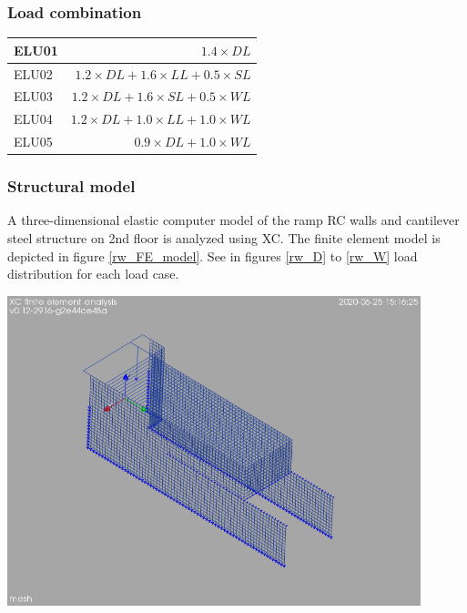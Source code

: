 \subsubsection{Load combination}
\begin{center}
  \begin{tabular}{|l|r|}
\hline
ELU01 & $1.4 \times DL$ \\
\hline
ELU02 & $ 1.2 \times DL +1.6 \times LL +0.5 \times SL $ \\
\hline
ELU03 & $ 1.2 \times DL +1.6 \times SL +0.5 \times WL $ \\
\hline
ELU04 & $ 1.2 \times DL +1.0 \times LL +1.0 \times WL $ \\
\hline
ELU05 & $ 0.9 \times DL +1.0 \times WL $ \\
\hline
\end{tabular}
\end{center}

\subsubsection{Structural model}
A three-dimensional elastic computer model of the ramp RC walls and cantilever steel structure on 2nd floor is analyzed using XC. The finite element model is depicted in figure \ref{rw_FE_model}. See in figures \ref{rw_D} to \ref{rw_W} load distribution for each load case.
\begin{Figure}
    \centering
    \includegraphics[width=120mm]{ramp_wall/figures/FE_model}
    \label{rw_FE_model}
\end{Figure}

